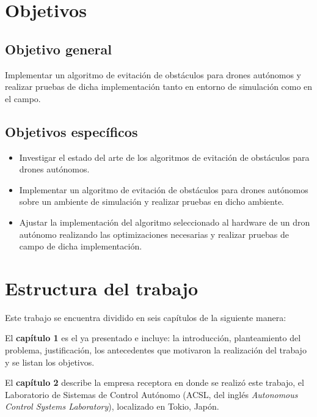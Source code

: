    
\section{Objetivos}

    \subsection{Objetivo general}
    
    Implementar un algoritmo de evitación de obstáculos para drones autónomos y realizar
    pruebas de dicha implementación tanto en entorno de simulación como en el campo.
    
    \subsection{Objetivos específicos}
    
    \begin{itemize}
        \item Investigar el estado del arte de los algoritmos de evitación de obstáculos para drones autónomos.
        \item Implementar un algoritmo de evitación de obstáculos para drones autónomos sobre un ambiente de simulación y realizar pruebas en dicho ambiente.
        \item Ajustar la implementación del algoritmo seleccionado al hardware de un dron autónomo realizando las optimizaciones necesarias y realizar pruebas de campo de dicha implementación.
    \end{itemize}

\section{Estructura del trabajo}

    \par Este trabajo se encuentra dividido en seis capítulos de la siguiente manera:
    
    \par El \textbf{capítulo 1} es el ya presentado e incluye: la introducción, planteamiento del problema, justificación, los antecedentes que motivaron la realización del trabajo y se listan los objetivos.

    \par El \textbf{capítulo 2} describe la empresa receptora en donde se realizó este trabajo, el Laboratorio de Sistemas de Control Autónomo (ACSL, del inglés \textit{Autonomous Control Systems Laboratory}), localizado en Tokio, Japón. 
    
